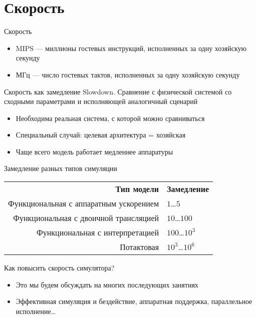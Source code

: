\documentclass{beamer}
\begin{document}
\section{Скорость}

\begin{frame}{Скорость}
\begin{itemize}
\item MIPS — миллионы гостевых инструкций, исполненных за одну хозяйскую секунду
\item МГц — число гостевых тактов, исполненных за одну хозяйскую секунду
\end{itemize}
\end{frame}

\begin{frame}{Скорость как замедление}
Slowdown. Сравнение с физической системой со сходными параметрами и исполняющей аналогичный сценарий
\begin{itemize}
\item Необходима реальная система, с которой можно сравниваться
\item Специальный случай: целевая архитектура = хозяйская %
\item Чаще всего модель работает медленнее аппаратуры
\end{itemize}
\end{frame}

\begin{frame}{Замедление разных типов симуляции}
\begin{tabular}{rl}
\textbf{Тип модели}                    & \textbf{Замедление} \\
Функциональная с аппаратным ускорением & $1$\dots$5$ \\
Функциональная с двоичной трансляцией  & $10$\dots$100$ \\
Функциональная с интерпретацией        & $100$\dots$10^3$ \\
Потактовая                             & $10^3$\dots$10^6$ \\
\end{tabular}

\end{frame}


\begin{frame}{Как повысить скорость симулятора?}
\begin{itemize}
\item Это мы будем обсуждать на многих последующих занятиях
\item Эффективная симуляция и бездействие, аппаратная поддержка, параллельное исполнение\dots
\end{itemize}
\end{frame}
\end{document}

